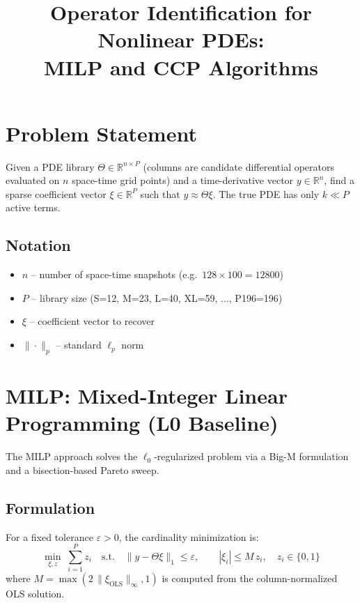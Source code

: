 \documentclass[11pt]{article}
\title{Operator Identification for Nonlinear PDEs: \\
       MILP and CCP Algorithms}
\author{}
\begin{document}
\maketitle

\section{Problem Statement}
Given a PDE library $\Theta \in \mathbb{R}^{n \times P}$ (columns are candidate
differential operators evaluated on $n$ space-time grid points) and a
time-derivative vector $y \in \mathbb{R}^n$, find a sparse coefficient vector
$\xi \in \mathbb{R}^P$ such that $y \approx \Theta \xi$.
The true PDE has only $k \ll P$ active terms.

\subsection{Notation}
\begin{itemize}
  \item $n$ -- number of space-time snapshots (e.g.\ $128 \times 100 = 12800$)
  \item $P$ -- library size (S=12, M=23, L=40, XL=59, $\ldots$, P196=196)
  \item $\xi$ -- coefficient vector to recover
  \item $\|\cdot\|_p$ -- standard $\ell_p$ norm
\end{itemize}

\section{MILP: Mixed-Integer Linear Programming (L0 Baseline)}

The MILP approach solves the $\ell_0$-regularized problem via
a Big-M formulation and a bisection-based Pareto sweep.

\subsection{Formulation}

For a fixed tolerance $\varepsilon > 0$, the cardinality minimization is:
\begin{equation}
\min_{\xi, z} \; \sum_{i=1}^P z_i
\quad \text{s.t.} \quad
\|y - \Theta \xi\|_1 \le \varepsilon, \qquad
| \xi_i | \le M \, z_i, \quad z_i \in \{0,1\}
\label{eq:milp}
\end{equation}
where $M = \max(2\,\|\xi_{\text{OLS}}\|_\infty, 1)$ is computed from
the column-normalized OLS solution.
\end{document}
